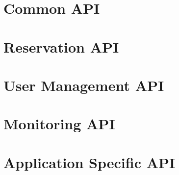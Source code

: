\documentclass[a4paper]{report}
\newenvironment{Api}{\begin{itemize}}{\end{itemize}}
\newcommand{\ApiCode}[1]{\lstinline[style=styleApi]|#1|}
\newcommand{\ApiItem}[1]{\item #1 %

}
\newcommand{\ApiCmd}[1]{\ApiItem{\ApiCode{#1}}}
\newcommand{\ApiClass}[2]{\ApiItem{%
  \ifx&#2& \ApiCode{class #1} \else \ApiCode{class #1 extends #2} \fi}%
}
\newenvironment{ApiClassAttributes}{%

\begin{samepage}\textbf{Attributes:}\begin{compactitem}}{\end{compactitem}\end{samepage}}
\newcommand{\ApiRequired}{{\color{blue!50!black}\textbf{Required}}}
\newcommand{\ApiReadOnly}{{\color{red!50!black}\textbf{ReadOnly}}}
\newcommand{\ApiClassAttribute}[3]{\ApiItem{\ApiCode{#2} \ApiCode{#1} \hspace{1mm}(\ifx&#3&\ApiReadOnly\else#3\fi)
}}
\begin{document}



\section{Common API}




\section{Reservation API}




\section{User Management API}

\section{Monitoring API}




\section{Application Specific API}
\end{document}
